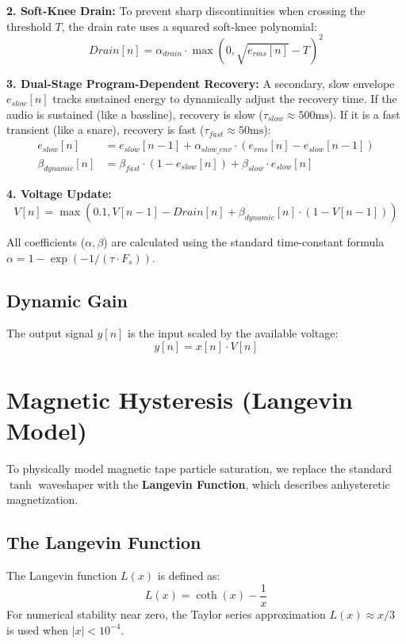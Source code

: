 \documentclass[a4paper, 11pt]{article}
\begin{document}
\textbf{2. Soft-Knee Drain:}
To prevent sharp discontinuities when crossing the threshold $T$, the drain rate uses a squared soft-knee polynomial:
\begin{equation}
    Drain[n] = \alpha_{drain} \cdot \max\left(0, \sqrt{e_{rms}[n]} - T\right)^2
\end{equation}

\textbf{3. Dual-Stage Program-Dependent Recovery:}
A secondary, slow envelope $e_{slow}[n]$ tracks sustained energy to dynamically adjust the recovery time. If the audio is sustained (like a bassline), recovery is slow ($\tau_{slow} \approx 500\text{ms}$). If it is a fast transient (like a snare), recovery is fast ($\tau_{fast} \approx 50\text{ms}$):
\begin{align}
    e_{slow}[n] &= e_{slow}[n-1] + \alpha_{slow\_env} \cdot (e_{rms}[n] - e_{slow}[n-1]) \\
    \beta_{dynamic}[n] &= \beta_{fast} \cdot (1 - e_{slow}[n]) + \beta_{slow} \cdot e_{slow}[n]
\end{align}

\textbf{4. Voltage Update:}
\begin{equation}
    V[n] = \max\left(0.1, V[n-1] - Drain[n] + \beta_{dynamic}[n] \cdot (1 - V[n-1])\right)
\end{equation}

All coefficients ($\alpha, \beta$) are calculated using the standard time-constant formula $\alpha = 1 - \exp(-1 / (\tau \cdot F_s))$.

\subsection{Dynamic Gain}
The output signal $y[n]$ is the input scaled by the available voltage:
\begin{equation}
    y[n] = x[n] \cdot V[n]
\end{equation}

\section{Magnetic Hysteresis (Langevin Model)}
To physically model magnetic tape particle saturation, we replace the standard $\tanh$ waveshaper with the \textbf{Langevin Function}, which describes anhysteretic magnetization.

\subsection{The Langevin Function}
The Langevin function $L(x)$ is defined as:
\begin{equation}
    L(x) = \coth(x) - \frac{1}{x}
\end{equation}
For numerical stability near zero, the Taylor series approximation $L(x) \approx x/3$ is used when $|x| < 10^{-4}$.
\end{document}
